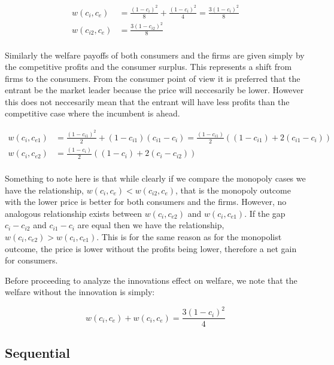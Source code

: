 \documentclass[11pt]{article}
\begin{document}
\begin{align*}
w(c_{i}, c_{e}) &= \frac{(1-c_i)^2}{8} + \frac{(1-c_i)^2}{4}= \frac{3(1-c_i)^2}{8} \\
w(c_{i2}, c_{e}) &= \frac{3(1-c_{i2})^2}{8} \\
\end{align*}

Similarly the welfare payoffs of both consumers and the firms are given simply by the competitive profits and the consumer surplus. This represents a shift from firms to the consumers. From the consumer point of view it is preferred that the entrant be the market leader because the price will neccesarily be lower. However this does not neccesarily mean that the entrant will have less profits than the competitive case where the incumbent is ahead. 

\begin{align*}
w(c_{i}, c_{e1}) &= \frac{(1-c_{i1})^2}{2} + (1-c_{i1})(c_{i1}-c_i)= \frac{(1-c_{i1})}{2} 
\left(
(1-c_{i1})+2(c_{i1}-c_i )
\right) \\
w(c_{i}, c_{e2}) &= \frac{(1-c_{i})}{2} 
\left(
(1-c_{i})+2(c_{i}-c_{i2} )
\right) \\
\end{align*}

Something to note here is that while clearly if we compare the monopoly cases we have the relationship, $w(c_{i}, c_{e})<w(c_{i2}, c_{e})$, that is the monopoly outcome with the lower price is better for both consumers and the firms. However, no analogous relationship exists between $w(c_{i}, c_{e2})$ and $w(c_{i}, c_{e1})$. If the gap $c_i-c_{i2}$ and $c_{i1}-c_{i}$ are equal then we have the relationship, $w(c_{i}, c_{e2})>w(c_{i}, c_{e1})$. This is for the same reason as for the monopolist outcome, the price is lower without the profits being lower, therefore a net gain for consumers. 

Before proceeding to analyze the innovations effect on welfare, we note that the welfare without the innovation is simply:

\begin{equation*}
w(c_{i}, c_{e})+w(c_{i}, c_{e}) = \frac{3(1-c_i)^2}{4}
\end{equation*}

\subsection{Sequential}
\end{document}
